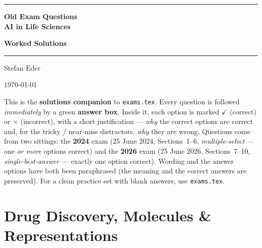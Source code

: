 \documentclass[11pt,oneside]{article}
\newcommand{\coursetitle}{AI in Life Sciences}
\newcounter{question}
\begin{document}
\thispagestyle{empty}
\vspace*{1.4cm}
\begin{center}
  {\color{accent}\rule{\linewidth}{1.8pt}}\par
  \vspace{0.65cm}
  {\fontsize{26}{32}\selectfont\bfseries\color{accent}Old Exam Questions\\[2pt] \coursetitle\par}
  \vspace{0.25cm}
  {\Large\color{key@frame}\bfseries Worked Solutions\par}
  \vspace{0.55cm}
  {\color{accent!35}\rule{\linewidth}{0.5pt}}\par
  \vspace{0.55cm}
  {\large Stefan Eder\par}
  \vspace{0.15cm}
  {\small\color{gray!70}\today\par}
\end{center}

\vspace{0.9cm}
\begin{notebox}
This is the \textbf{solutions companion} to \texttt{exams.tex}. Every question is
followed \emph{immediately} by a green \textbf{answer box}. Inside it, each option is
marked \textcolor{ok}{\ensuremath{\checkmark}} (correct) or
\textcolor{bad}{\ensuremath{\bm\times}} (incorrect), with a short justification ---
\emph{why} the correct options are correct and, for the tricky / near-miss
distractors, \emph{why} they are wrong. Questions come from two sittings: the
\textbf{2024} exam (25 June 2024, Sections~1--6, \emph{multiple-select} --- one
\emph{or more} options correct) and the \textbf{2026} exam (25 June 2026,
Sections~7--10, \emph{single-best-answer} --- exactly one option correct). Wording
and the answer options have both been paraphrased (the meaning and the correct
answers are preserved). For a clean practice set with blank answers, use
\texttt{exams.tex}.
\end{notebox}

\tableofcontents
\newpage


\section{Drug Discovery, Molecules \& Representations}
\end{document}
